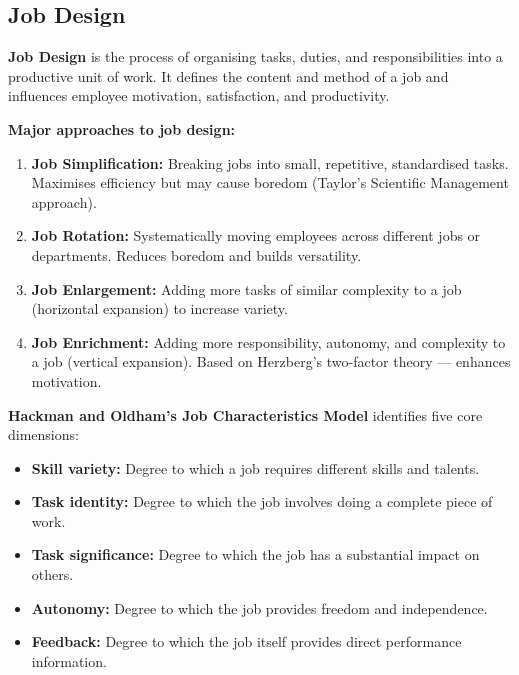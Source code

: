 \documentclass[12pt,a4paper]{article}
\begin{document}
\subsection{Job Design}

\begin{tcolorbox}[defbox, title={\textbf{Job Design}}]
\textbf{Job Design} is the process of organising tasks, duties, and responsibilities into a productive unit of work. It defines the content and method of a job and influences employee motivation, satisfaction, and productivity.
\end{tcolorbox}

\textbf{Major approaches to job design:}
\begin{enumerate}[label=\textbf{\arabic*.}, leftmargin=*, itemsep=3pt, topsep=2pt]
  \item \textbf{Job Simplification:} Breaking jobs into small, repetitive, standardised tasks. Maximises efficiency but may cause boredom (Taylor's Scientific Management approach).
  \item \textbf{Job Rotation:} Systematically moving employees across different jobs or departments. Reduces boredom and builds versatility.
  \item \textbf{Job Enlargement:} Adding more tasks of similar complexity to a job (horizontal expansion) to increase variety.
  \item \textbf{Job Enrichment:} Adding more responsibility, autonomy, and complexity to a job (vertical expansion). Based on Herzberg's two-factor theory --- enhances motivation.
\end{enumerate}

\textbf{Hackman and Oldham's Job Characteristics Model} identifies five core dimensions:
\begin{itemize}[leftmargin=*, itemsep=2pt]
  \item \textbf{Skill variety:} Degree to which a job requires different skills and talents.
  \item \textbf{Task identity:} Degree to which the job involves doing a complete piece of work.
  \item \textbf{Task significance:} Degree to which the job has a substantial impact on others.
  \item \textbf{Autonomy:} Degree to which the job provides freedom and independence.
  \item \textbf{Feedback:} Degree to which the job itself provides direct performance information.
\end{itemize}
\end{document}
